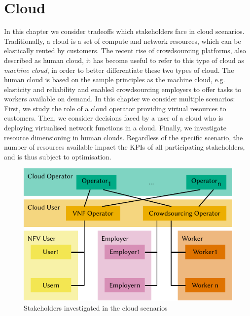 \chapter{Cloud}\label{chap:cloud}

In this chapter we consider tradeoffs which stakeholders face in cloud scenarios.
Traditionally, a cloud is a set of compute and network resources, which can be elastically rented by customers.
The recent rise of crowdsourcing platforms, also described as human cloud, it has become useful to refer to this type of cloud as \emph{machine cloud}, in order to better differentiate these two types of cloud.
The human cloud is based on the sample principles as the machine cloud, e.g. elasticity and reliability and enabled crowdsourcing employers to offer tasks to workers available on demand.
In this chapter we consider multiple scenarios:
First, we study the role of a cloud operator providing virtual resources to customers.
Then, we consider decisions faced by a user of a cloud who is deploying virtualised network functions in a cloud.
Finally, we investigate resource dimensioning in human clouds.
Regardless of the specific scenario, the number of resources available impact the \glspl{KPI} of all participating stakeholders, and is thus subject to optimisation.

\begin{figure}
  \centering
  \includegraphics{cloud/figures/model}
  \caption{Stakeholders investigated in the cloud scenarios}
  \label{fig:cloud:model}
\end{figure}

